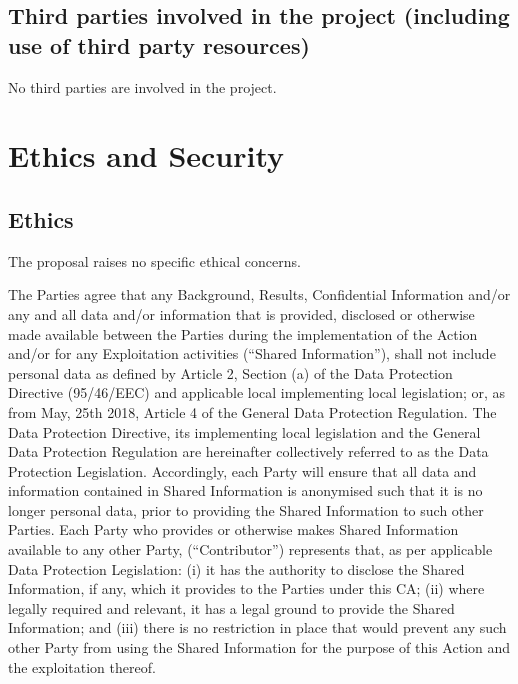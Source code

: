 \documentclass[a4paper,11pt]{article}
\begin{document}
\newpage
\subsection{Third parties involved in the project (including use of third party resources)}

No third parties are involved in the project.


\newpage

\section{Ethics and Security}

\subsection{Ethics}

The proposal raises no specific ethical concerns.

The Parties agree that any Background, Results, Confidential Information
and/or any and all data and/or information that is provided, disclosed or
otherwise made available between the Parties during the implementation of
the Action and/or for any Exploitation activities (``Shared Information''),
shall not include personal data as defined by Article 2, Section (a) of
the Data Protection Directive (95/46/EEC) and applicable local
implementing local legislation; or, as from May, 25th 2018, Article 4 of
the General Data Protection Regulation. The Data Protection Directive,
its implementing local legislation and the General Data Protection
Regulation are hereinafter collectively referred to as the Data
Protection Legislation.  Accordingly, each Party will ensure that all
data and information contained in Shared Information is anonymised such
that it is no longer personal data, prior to providing the Shared
Information to such other Parties. Each Party who provides or otherwise
makes Shared Information available to any other Party, (``Contributor'')
represents that, as per applicable Data Protection Legislation: (i) it
has the authority to disclose the Shared Information, if any, which it
provides to the Parties under this CA; (ii) where legally required and
relevant, it has a legal ground to provide the Shared Information; and
(iii) there is no restriction in place that would prevent any such other
Party from using the Shared Information for the purpose of this Action
and the exploitation thereof.
\end{document}
